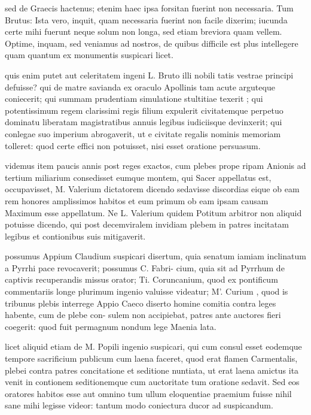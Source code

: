  sed de Graecis hactenus; etenim haec ipsa forsitan fuerint non necessaria. Tum Brutus: Ista vero, inquit, quam necessaria fuerint non facile dixerim; iucunda certe mihi fuerunt neque solum non longa, sed etiam breviora quam vellem. Optime, inquam, sed veniamus ad nostros, de quibus difficile est plus intellegere quam quantum ex monumentis suspicari licet.

 quis enim putet aut celeritatem ingeni L. Bruto illi nobili tatis vestrae principi defuisse? qui de matre savianda ex oraculo Apollinis tam acute arguteque coniecerit; qui summam prudentiam simulatione stultitiae texerit ; qui potentissimum regem clarissimi regis filium expulerit civitatemque perpetuo dominatu liberatam magistratibus annuis legibus iudiciisque devinxerit; qui conlegae suo imperium abrogaverit, ut e civitate regalis nominis memoriam tolleret: quod certe effici non potuisset, nisi esset oratione persuasum.

 videmus item paucis annis post reges exactos, cum plebes prope ripam Anionis ad tertium miliarium consedisset eumque montem, qui Sacer appellatus est, occupavisset, M. Valerium dictatorem dicendo sedavisse discordias eique ob eam rem honores amplissimos habitos et eum primum ob eam ipsam causam Maximum esse appellatum. Ne L. Valerium quidem Potitum arbitror non aliquid potuisse dicendo, qui post decemviralem invidiam plebem in patres incitatam legibus et contionibus suis mitigaverit.

 possumus Appium Claudium suspicari disertum, quia senatum iamiam inclinatum a Pyrrhi pace revocaverit; possumus C. Fabri- cium, quia sit ad Pyrrhum de captivis recuperandis missus orator; Ti. Coruncanium, quod ex pontificum commentariis longe plurimum ingenio valuisse videatur; M'. Curium , quod is tribunus plebis interrege Appio Caeco diserto homine comitia contra leges habente, cum de plebe con- sulem non accipiebat, patres ante auctores fieri coegerit: quod fuit permagnum nondum lege Maenia lata.

 licet aliquid etiam de M. Popili ingenio suspicari, qui cum consul esset eodemque tempore sacrificium publicum cum laena faceret, quod erat flamen Carmentalis, plebei contra patres concitatione et seditione nuntiata, ut erat laena amictus ita venit in contionem seditionemque cum auctoritate tum oratione sedavit. Sed eos oratores habitos esse aut omnino tum ullum eloquentiae praemium fuisse nihil sane mihi legisse videor: tantum modo coniectura ducor ad suspicandum.

